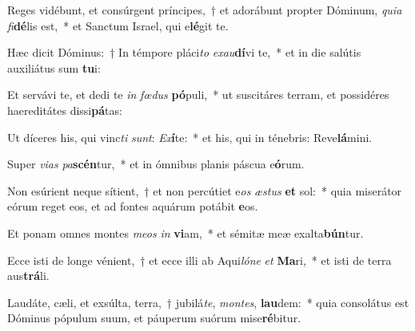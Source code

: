 \item Reges vidébunt, et consúrgent príncipes,~† et adorábunt propter Dóminum, \textit{qui}\textit{a} \textit{fi}\textbf{dé}lis est,~* et Sanctum Israel, qui e\textbf{lé}git te.
\item Hæc dicit Dóminus:~† In témpore pláci\textit{to} \textit{ex}\textit{au}\textbf{dí}vi te,~* et in die salútis auxiliátus sum \textbf{tu}i:
\item Et servávi te, et dedi te \textit{in} \textit{fœ}\textit{dus} \textbf{pó}puli,~* ut suscitáres terram, et possidéres haereditátes dissi\textbf{pá}tas:
\item Ut díceres his, qui vinc\textit{ti} \textit{sunt}: \textit{Ex}\textbf{í}te:~* et his, qui in ténebris: Reve\textbf{lá}mini.
\item Super \textit{vi}\textit{as} \textit{pa}\textbf{scén}tur,~* et in ómnibus planis páscua e\textbf{ó}rum.
\item Non esúrient neque sítient,~† et non percútiet e\textit{os} \textit{æs}\textit{tus} \textbf{et} sol:~* quia miserátor eórum reget eos, et ad fontes aquárum potábit \textbf{e}os.
\item Et ponam omnes montes \textit{me}\textit{os} \textit{in} \textbf{vi}am,~* et sémitæ meæ exalta\textbf{bún}tur.
\item Ecce isti de longe vénient,~† et ecce illi ab Aqui\textit{ló}\textit{ne} \textit{et} \textbf{Ma}ri,~* et isti de terra aus\textbf{trá}li.
\item Laudáte, cæli, et exsúlta, terra,~† jubilá\textit{te}, \textit{mon}\textit{tes}, \textbf{lau}dem:~* quia consolátus est Dóminus pópulum suum, et páuperum suórum mise\textbf{ré}bitur.

